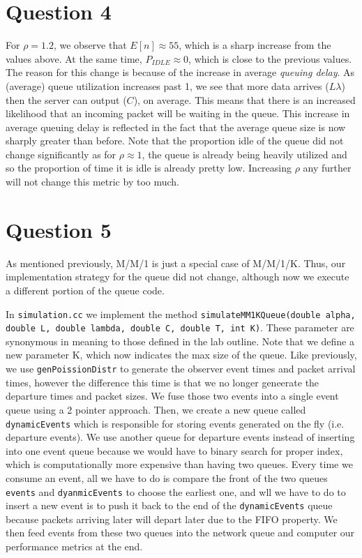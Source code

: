 \documentclass{article}
\begin{document}
\section{Question 4}
For $\rho = 1.2$, we observe that $E[n] \approx 55$, which is a sharp increase from the values above. At the same time, $P_{IDLE} \approx 0$, which is close to the
previous values. The reason for this change is because of the increase in average \textit{queuing delay}. As (average) queue utilization increases past 1, we see
that more data arrives ($L\lambda$) then the server can output ($C$), on average. This means that there is an increased likelihood that an incoming packet will be
waiting in the queue. This increase in average queuing delay is reflected in the fact that the average queue size is now sharply greater than before. Note that the proportion
idle of the queue did not change significantly as for $\rho \approx 1$, the queue is already being heavily utilized and so the proportion of time it is idle is already
pretty low. Increasing $\rho$ any further will not change this metric by too much.

\section{Question 5}
As mentioned previously, M/M/1 is just a special case of M/M/1/K. Thus, our implementation strategy for the queue did not change, although now
we execute a different portion of the queue code. \newline

In \texttt{simulation.cc} we implement the method \texttt{simulateMM1KQueue(double alpha, double L, double lambda, double C, double T, int K)}. These parameter are
synonymous in meaning to those defined in the lab outline. Note that we define a new parameter K, which now indicates the max size of the queue. Like previously, we
use \texttt{genPoissionDistr} to generate the observer event times and packet arrival times, however the difference this time is that we no longer geneerate the departure
times and packet sizes. We fuse those two events into a single event queue using a 2 pointer approach. Then, we create a new queue called \texttt{dynamicEvents} which is
responsible for storing events generated on the fly (i.e. departure events). We use another queue for departure events instead of inserting into one event queue because
we would have to binary search for proper index, which is computationally more expensive than having two queues. Every time we consume an event, all we have to do is compare
the front of the two queues \texttt{events} and \texttt{dyanmicEvents} to choose the earliest one, and wll we have to do to insert a new event is to push it back to the
end of the \texttt{dynamicEvents} queue because packets arriving later will depart later due to the FIFO property. We then feed events from these two queues into the network
queue and computer our performance metrics at the end. \newline
\end{document}
